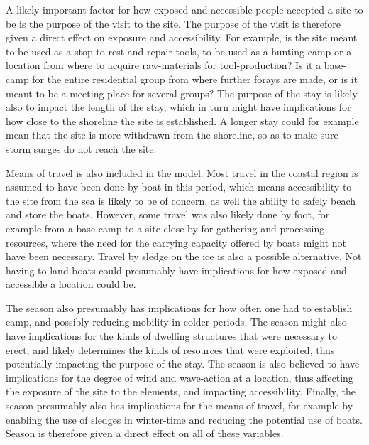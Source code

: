 \documentclass[
  12pt,
  a4paper,
  oneside]{book}
\begin{document}
A likely important factor for how exposed and accessible people accepted a site to be is the purpose of the visit to the site. The purpose of the visit is therefore given a direct effect on exposure and accessibility. For example, is the site meant to be used as a stop to rest and repair tools, to be used as a hunting camp or a location from where to acquire raw-materials for tool-production? Is it a base-camp for the entire residential group from where further forays are made, or is it meant to be a meeting place for several groups? The purpose of the stay is likely also to impact the length of the stay, which in turn might have implications for how close to the shoreline the site is established. A longer stay could for example mean that the site is more withdrawn from the shoreline, so as to make sure storm surges do not reach the site.

Means of travel is also included in the model. Most travel in the coastal region is assumed to have been done by boat in this period, which means accessibility to the site from the sea is likely to be of concern, as well the ability to safely beach and store the boats. However, some travel was also likely done by foot, for example from a base-camp to a site close by for gathering and processing resources, where the need for the carrying capacity offered by boats might not have been necessary. Travel by sledge on the ice is also a possible alternative. Not having to land boats could presumably have implications for how exposed and accessible a location could be.

The season also presumably has implications for how often one had to establish camp, and possibly reducing mobility in colder periods. The season might also have implications for the kinds of dwelling structures that were necessary to erect, and likely determines the kinds of resources that were exploited, thus potentially impacting the purpose of the stay. The season is also believed to have implications for the degree of wind and wave-action at a location, thus affecting the exposure of the site to the elements, and impacting accessibility. Finally, the season presumably also has implications for the means of travel, for example by enabling the use of sledges in winter-time and reducing the potential use of boats. Season is therefore given a direct effect on all of these variables.
\end{document}
